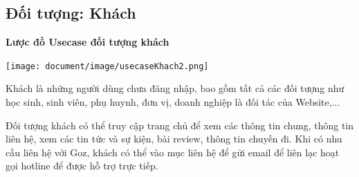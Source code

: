     
\subsection{Đối tượng: Khách}
\textbf{Lược đồ Usecase đối tượng khách}
\begin{center}
  \captionsetup{type=figure}
  \texttt{[image: document/image/usecaseKhach2.png]}
\end{center}

Khách là những người dùng chưa đăng nhập, bao gồm tất cả các đối tượng như học sinh,  sinh viên, phụ huynh, đơn vị, doanh nghiệp là đối tác của Website,...
 
 Đối tượng khách có thể truy cập trang chủ để xem các thông tin chung, thông tin liên hệ, xem các tin tức và sự kiện, bài review, thông tin chuyến đi. Khi có nhu cầu liên hệ với Goz, khách có thể vào mục liên hệ để gửi email để liên lạc hoạt gọi hotline để được hỗ trợ trực tiếp.
 

